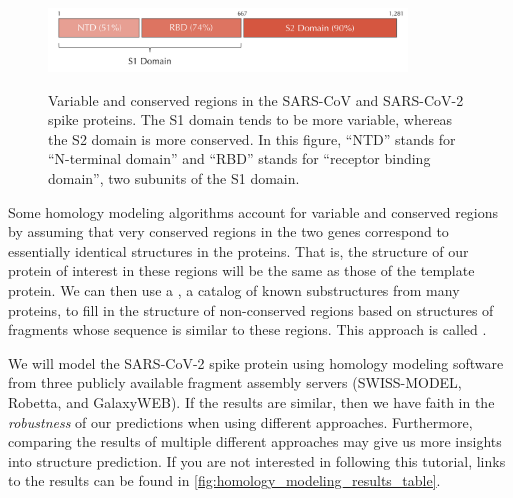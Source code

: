 \begin{figure}[h]
	\centering
	\mySfFamily
	\includegraphics[width = 0.85\textwidth]{../images/spike_protein_similarity.png}\\
	\caption{Variable and conserved regions in the SARS-CoV and SARS-CoV-2 spike proteins. The S1 domain tends to be more variable, whereas the S2 domain is more conserved. In this figure, ``NTD'' stands for ``N-terminal domain'' and ``RBD'' stands for ``receptor binding domain'', two subunits of the S1 domain.}
	\label{fig:spike_protein_similarity}
\end{figure}

Some homology modeling algorithms account for variable and conserved regions by assuming that very conserved regions in the two genes correspond to essentially identical structures in the proteins. That is, the structure of our protein of interest in these regions will be the same as those of the template protein. We can then use a , a catalog of known substructures from many proteins, to fill in the structure of non-conserved regions based on structures of fragments whose sequence is similar to these regions. This approach is called .

We will model the SARS-CoV-2 spike protein using homology modeling software from three publicly available fragment assembly servers (SWISS-MODEL, Robetta, and GalaxyWEB). If the results are similar, then we have faith in the \textit{robustness} of our predictions when using different approaches. Furthermore, comparing the results of multiple different approaches may give us more insights into structure prediction. If you are not interested in following this tutorial, links to the results can be found in \autoref{fig:homology_modeling_results_table}.\\


